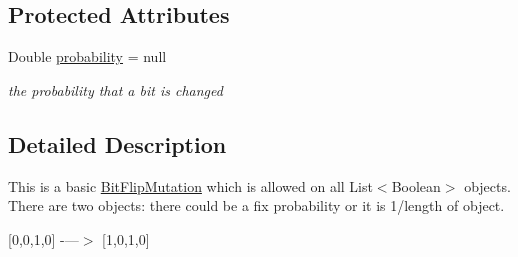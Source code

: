 \subsection*{Protected Attributes}
\begin{DoxyCompactItemize}
\item 
\hypertarget{classcom_1_1msu_1_1moo_1_1operators_1_1mutation_1_1BitFlipMutation_a171f6a7c34816318f48116e75eca4b7c}{Double \hyperlink{classcom_1_1msu_1_1moo_1_1operators_1_1mutation_1_1BitFlipMutation_a171f6a7c34816318f48116e75eca4b7c}{probability} = null}\label{classcom_1_1msu_1_1moo_1_1operators_1_1mutation_1_1BitFlipMutation_a171f6a7c34816318f48116e75eca4b7c}

\begin{DoxyCompactList}\small\item\em the probability that a bit is changed \end{DoxyCompactList}\end{DoxyCompactItemize}


\subsection{Detailed Description}
This is a basic \hyperlink{classcom_1_1msu_1_1moo_1_1operators_1_1mutation_1_1BitFlipMutation}{Bit\-Flip\-Mutation} which is allowed on all List$<$\-Boolean$>$ objects. There are two objects\-: there could be a fix probability or it is 1/length of object.

\mbox{[}0,0,1,0\mbox{]} -\/---$>$ \mbox{[}1,0,1,0\mbox{]} 

